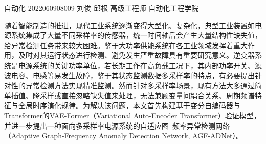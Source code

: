 \documentclass[bachelor, vlined]{DissertUESTC}
\begin{document}








	{自动化}
	{2022060908009}
	{刘俊}
	{邱根}
	{高级工程师}
	{自动化工程学院}  %


	\zhabstract

	随着智能制造的推进，现代工业系统逐渐变得大型化、复杂化，典型工业装置如电源系统集成了大量不同采样率的传感器，统一时间轴后会产生大量结构性缺失值，给异常检测任务带来较大困难。鉴于大功率供能系统在各工业领域发挥着重大作用，及时对其运行状态进行检测、避免发生严重故障具有重要研究意义。逆变器系统是电源系统的关键功率单位，若长期工作在高负载工况下，其内部功率开关、滤波电容、电感等易发生故障，鉴于其状态监测数据多采样率的特点，有必要提出针对性的异常检测方法实现精准监测。然而针对多采样率场景，现有方法大多通过简单插值、降采样或直接忽略缺失值来处理，无法兼顾变量间耦合关系、周期频谱特征与全局时序演化规律。为解决该问题，本文首先构建基于变分自编码器与Transformer的VAE-Former（Variational Auto-Encoder Transformer）验证模型，并进一步提出一种面向多采样率电源系统的自适应图--频率异常检测网络（Adaptive Graph-Frequency Anomaly Detection Network, AGF-ADNet）。
\end{document}
